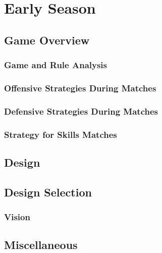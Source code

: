 \chapter{Early Season}

\section{Game Overview}
\subsection{Game and Rule Analysis}
\subsection{Offensive Strategies During Matches}
\subsection{Defensive Strategies During Matches}
\subsection{Strategy for Skills Matches}

\section{Design}
\section{Design Selection}
\subsection{Vision}
\section{Miscellaneous}

\pagebreak
{}


